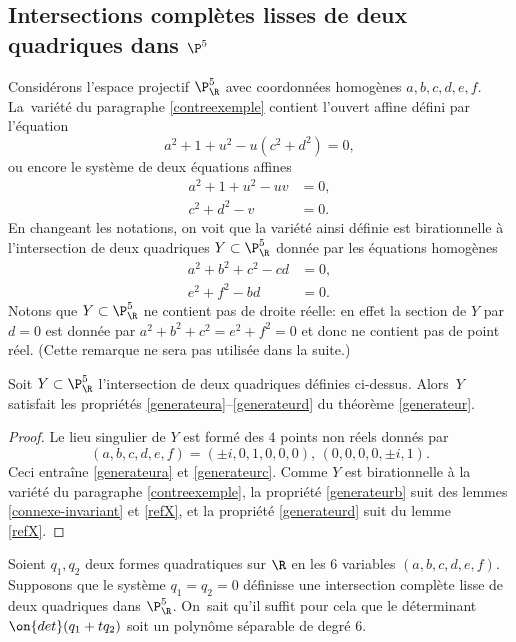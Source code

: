 \subsection{Intersections complètes lisses de deux quadriques dans \texorpdfstring{$\P^5$}{P5}}
Considérons l'espace projectif $\P^5_\R$ avec coordonnées homogènes $a,b,c,d,e,f$. La~variété du paragraphe \ref{contreexemple} contient l'ouvert affine défini par l'équation
\[a^2+1+u^2 - u (c^2+d^2)=0,\]
ou encore le système de deux équations affines
\begin{align*}
a^2+1+u^2 -uv &=0, \\
c^2+d^2-v&=0.
\end{align*}
En changeant les notations, on voit que
la variété ainsi définie est birationnelle
à l'intersection de
deux quadriques $Y\subset \P^5_{\R}$
donnée par les équations homogènes
\begin{align*}
a^2+ b^2+c^2 - cd&=0,\\
e^2+f^2-bd&= 0.
\end{align*}
Notons que $Y \subset \P^5_\R$ ne contient pas de droite réelle: en effet la section de $Y$ par $d=0$ est donnée par $a^2+ b^2+c^2=e^2+f^2=0$ et donc ne contient pas de point réel. (Cette remarque ne sera pas utilisée dans la suite.)

\begin{lemma}\label{speciale-int-quadriques}
Soit $Y\subset \P^5_\R$ l'intersection de deux quadriques définies ci-dessus. Alors~$Y$ satisfait les propriétés \eqref{generateura}--\eqref{generateurd} du théorème \ref{generateur}.
\end{lemma}

\begin{proof}
Le lieu singulier de $Y$ est formé des $4$ points non réels donnés par
\[
(a,b,c,d,e,f)= (\pm i, 0, 1,0,0,0),\, (0,0,0,0,\pm i, 1).
\]
Ceci entraîne \eqref{generateura} et \eqref{generateurc}. Comme $Y$ est birationnelle à la variété du paragraphe \ref{contreexemple}, la propriété \eqref{generateurb} suit des lemmes \ref{connexe-invariant} et \ref{refX}, et la propriété \eqref{generateurd} suit du lemme \ref{refX}.
\end{proof}

Soient $q_1, q_2$ deux formes quadratiques sur $\R$ en les 6 variables $(a,b,c,d,e,f)$. Supposons
que le système $q_1=q_2=0$ définisse une intersection complète lisse de deux quadriques dans $\P^5_{\R}$. On~sait qu'il suffit pour cela que le déterminant $\on{det}(q_1+tq_2)$ soit un polynôme séparable de degré $6$.

